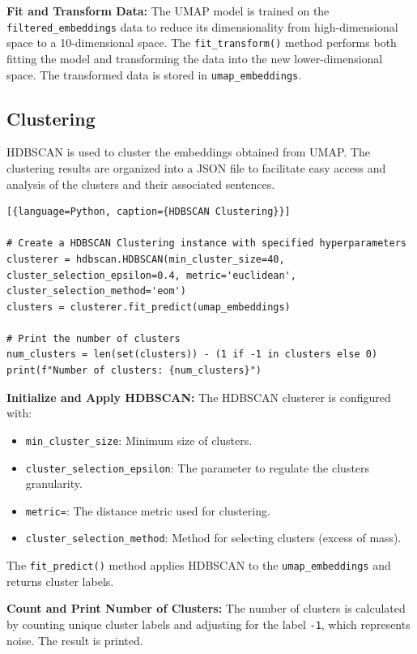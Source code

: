 \noindent\textbf{Fit and Transform Data:} The UMAP model is trained on the \texttt{filtered\_embeddings} data to reduce its dimensionality from high-dimensional space to a 10-dimensional space. 
The \texttt{fit\_transform()} method performs both fitting the model and transforming the data into the new lower-dimensional space. The transformed data is stored in \texttt{umap\_embeddings}.


\subsection{Clustering}
HDBSCAN is used to cluster the embeddings obtained from UMAP. The clustering results are organized into a JSON file 
to facilitate easy access and analysis of the clusters and their associated sentences.


\begin{lstlisting}[{language=Python, caption={HDBSCAN Clustering}}]

# Create a HDBSCAN Clustering instance with specified hyperparameters
clusterer = hdbscan.HDBSCAN(min_cluster_size=40, cluster_selection_epsilon=0.4, metric='euclidean', cluster_selection_method='eom')
clusters = clusterer.fit_predict(umap_embeddings)

# Print the number of clusters
num_clusters = len(set(clusters)) - (1 if -1 in clusters else 0)
print(f"Number of clusters: {num_clusters}")
\end{lstlisting}

\noindent\textbf{Initialize and Apply HDBSCAN:} The HDBSCAN clusterer is configured with:
\begin{itemize}
    \item \texttt{min\_cluster\_size}: Minimum size of clusters.
    \item \texttt{cluster\_selection\_epsilon}: The parameter to regulate the clusters granularity.
    \item \texttt{metric=}: The distance metric used for clustering.
    \item \texttt{cluster\_selection\_method}: Method for selecting clusters (excess of mass).
\end{itemize}
The \texttt{fit\_predict()} method applies HDBSCAN to the \texttt{umap\_embeddings} and returns cluster labels.

\noindent\textbf{Count and Print Number of Clusters:} The number of clusters is calculated by counting unique cluster labels and adjusting for the label \texttt{-1},
 which represents noise. The result is printed.
\vspace{3cm}

